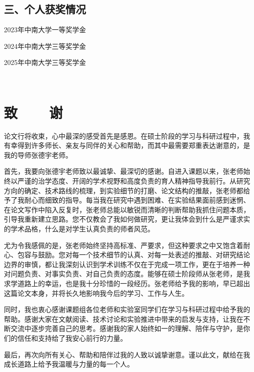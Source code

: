 \vspace{22pt}
\subsection*{三、个人获奖情况}
\begin{enumerate}[label={[\arabic*]},itemindent=2em,wide]
	\item 2023年中南大学一等奖学金
	\item 2024年中南大学三等奖学金
	\item 2025年中南大学三等奖学金
\end{enumerate}
\fi

\newpage

\ifblindreview
\else

{~}
\vspace{18pt}
\section{{致~~~~谢}} %
\renewcommand*{\baselinestretch}{1.0} %
\setlength{\baselineskip}{20pt} %

论文行将收束，心中最深的感受首先是感恩。在硕士阶段的学习与科研过程中，我有幸得到许多师长、亲友与同伴的关心和帮助，而其中最需要郑重表达谢意的，是我的导师张德宇老师。

首先，我要向张德宇老师致以最诚挚、最深切的感谢。自进入课题以来，张老师始终以严谨的治学态度、开阔的学术视野和高度负责的育人精神指导我前行。从研究方向的确定、技术路线的梳理，到实验细节的打磨、论文结构的推敲，张老师都给予了我耐心而细致的指导。每当我在研究中遇到困难、在实验结果面前感到迷惘、在论文写作中陷入反复时，张老师总能以敏锐而清晰的判断帮助我抓住问题本质，引导我重新建立思路。您不仅教会了我如何做研究，更让我体会到什么是严谨求实的学术品格，什么是对学生认真负责的师者风范。

尤为令我感佩的是，张老师始终坚持高标准、严要求，但这种要求之中又饱含着耐心、包容与鼓励。您对每一个技术细节的认真、对每一处表述的推敲、对研究结论边界的审慎，都让我深刻认识到学术训练不仅在于完成一项工作，更在于培养一种对问题负责、对事实负责、对自己负责的态度。能够在硕士阶段师从张老师，是我求学道路上的幸运，也是我十分珍惜的一段经历。张老师给予我的影响，早已超出这篇论文本身，并将长久地影响我今后的学习、工作与人生。

同时，我也衷心感谢课题组各位老师和实验室同学们在学习与科研过程中给予我的帮助。感谢大家在文献阅读、技术讨论和实验推进中带来的启发与支持，让我在不断交流中逐步完善自己的思考。感谢我的家人始终如一的理解、陪伴与守护，是你们的信任和支持给了我安心前行的力量。

最后，再次向所有关心、帮助和陪伴过我的人致以诚挚谢意。谨以此文，献给在我成长道路上给予我温暖与力量的每一个人。

\newpage
\fi
